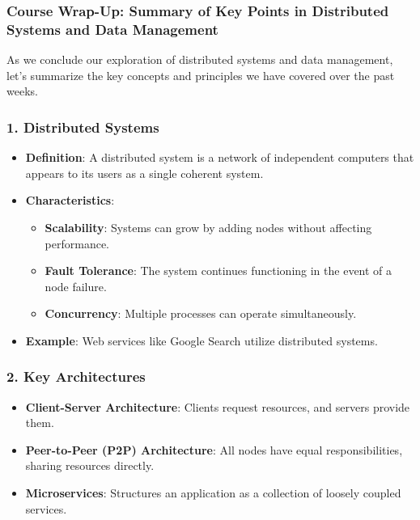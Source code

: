 \documentclass[aspectratio=169]{beamer}
\begin{document}
\begin{frame}[fragile]
  \frametitle{Course Wrap-Up: Summary of Key Points in Distributed Systems and Data Management}
  As we conclude our exploration of distributed systems and data management, let’s summarize the key concepts and principles we have covered over the past weeks.
\end{frame}

\begin{frame}[fragile]
  \frametitle{1. Distributed Systems}
  \begin{itemize}
    \item \textbf{Definition}: A distributed system is a network of independent computers that appears to its users as a single coherent system.
    \item \textbf{Characteristics}:
      \begin{itemize}
        \item \textbf{Scalability}: Systems can grow by adding nodes without affecting performance.
        \item \textbf{Fault Tolerance}: The system continues functioning in the event of a node failure.
        \item \textbf{Concurrency}: Multiple processes can operate simultaneously.
      \end{itemize}
    \item \textbf{Example}: Web services like Google Search utilize distributed systems.
  \end{itemize}
\end{frame}

\begin{frame}[fragile]
  \frametitle{2. Key Architectures}
  \begin{itemize}
    \item \textbf{Client-Server Architecture}: Clients request resources, and servers provide them.
    \item \textbf{Peer-to-Peer (P2P) Architecture}: All nodes have equal responsibilities, sharing resources directly.
    \item \textbf{Microservices}: Structures an application as a collection of loosely coupled services.
  \end{itemize}
\end{frame}
\end{document}
